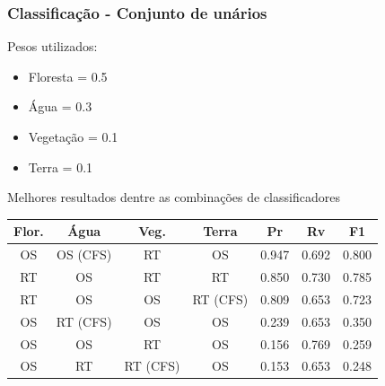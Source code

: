 \documentclass[t]{beamer}
\begin{document}
\begin{frame}[c]
	\frametitle{Classificação - Conjunto de unários}

	Pesos utilizados:
	\begin{itemize}
		\item Floresta = 0.5
		\item Água = 0.3
		\item Vegetação = 0.1
		\item Terra = 0.1
	\end{itemize}

	\centering
	Melhores resultados dentre as combinações de classificadores

	\small{
		\begin{table}[h]
		\centering
		\begin{tabulary}{\linewidth}{|C|C|C|C|C|C|C|}
		\hline
		\textbf{Flor.} & \textbf{Água} & \textbf{Veg.} & \textbf{Terra} & \textbf{Pr} & \textbf{Rv} & \textbf{F1} \\ \hline
		OS & OS (CFS) & RT       & OS       & 0.947 & 0.692 & 0.800 \\ \hline
		RT & OS       & RT       & RT       & 0.850 & 0.730 & 0.785 \\ \hline
		RT & OS       & OS       & RT (CFS) & 0.809 & 0.653 & 0.723 \\ \hline
		OS & RT (CFS) & OS       & OS       & 0.239 & 0.653 & 0.350 \\ \hline
		OS & OS       & RT       & OS       & 0.156 & 0.769 & 0.259 \\ \hline
		OS & RT       & RT (CFS) & OS       & 0.153 & 0.653 & 0.248 \\ \hline
		\end{tabulary}
		\end{table}
	}

\end{frame}
\end{document}
